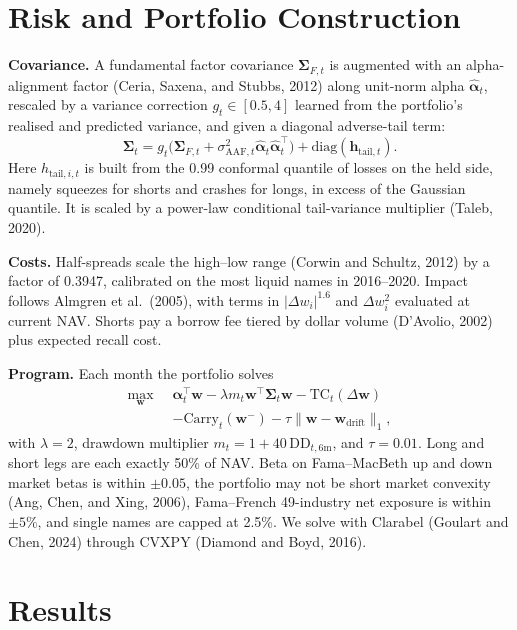 \documentclass[10pt,twocolumn,letterpaper]{article}
\begin{document}
\section{Risk and Portfolio Construction}

\textbf{Covariance.} A fundamental factor covariance $\bm{\Sigma}_{F,t}$ is augmented with an alpha-alignment factor (Ceria, Saxena, and Stubbs, 2012) along unit-norm alpha $\hat{\bm{\alpha}}_t$, rescaled by a variance correction $g_t \in [0.5, 4]$ learned from the portfolio's realised and predicted variance, and given a diagonal adverse-tail term:
\begin{equation}
\bm{\Sigma}_t = g_t\big(\bm{\Sigma}_{F,t} + \sigma_{\text{AAF},t}^2 \hat{\bm{\alpha}}_t \hat{\bm{\alpha}}_t^\top\big) + \mathrm{diag}(\mathbf{h}_{\text{tail},t}). \label{eq:sigma}
\end{equation}
Here $h_{\text{tail},i,t}$ is built from the 0.99 conformal quantile of losses on the held side, namely squeezes for shorts and crashes for longs, in excess of the Gaussian quantile. It is scaled by a power-law conditional tail-variance multiplier (Taleb, 2020).

\textbf{Costs.} Half-spreads scale the high--low range (Corwin and Schultz, 2012) by a factor of 0.3947, calibrated on the most liquid names in 2016--2020. Impact follows Almgren et al.\ (2005), with terms in $|\Delta w_i|^{1.6}$ and $\Delta w_i^2$ evaluated at current NAV. Shorts pay a borrow fee tiered by dollar volume (D'Avolio, 2002) plus expected recall cost.

\textbf{Program.} Each month the portfolio solves
\begin{align}
\max_{\mathbf{w}} \;\; & \bm{\alpha}_t^\top \mathbf{w} - \lambda m_t \mathbf{w}^\top \bm{\Sigma}_t \mathbf{w} - \mathrm{TC}_t(\Delta\mathbf{w}) \nonumber\\
& - \mathrm{Carry}_t(\mathbf{w}^-) - \tau \|\mathbf{w} - \mathbf{w}_{\text{drift}}\|_1, \label{eq:qp}
\end{align}
with $\lambda = 2$, drawdown multiplier $m_t = 1 + 40\,\mathrm{DD}_{t,6\text{m}}$, and $\tau = 0.01$. Long and short legs are each exactly 50\% of NAV. Beta on Fama--MacBeth up and down market betas is within $\pm 0.05$, the portfolio may not be short market convexity (Ang, Chen, and Xing, 2006), Fama--French 49-industry net exposure is within $\pm 5\%$, and single names are capped at 2.5\%. We solve with Clarabel (Goulart and Chen, 2024) through CVXPY (Diamond and Boyd, 2016).

\section{Results}
\end{document}
